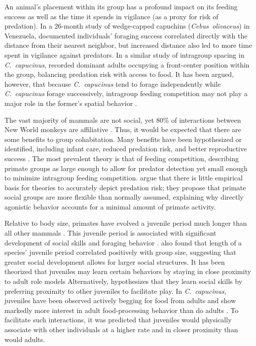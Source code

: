 \documentclass{../../../coursework}
\begin{document}
An animal's placement within its group has a profound impact on its feeding
success as well as the time it spends in vigilance (as a proxy for risk of
predation). In a 26-month study of wedge-capped capuchins
(\emph{Cebus~olivaceus}) in Venezuela, \textcite{Robinson1981} documented
individuals' foraging success correlated directly with the distance from their
nearest neighbor, but increased distance also led to more time spent in
vigilance against predators. In a similar study of intragroup spacing in
\emph{C.~capucinus}, \textcite{Hall1997} recorded dominant adults occupying a
front-center position within the group, balancing predation risk with access
to food. It has been argued, however, that because \emph{C.~capucinus} tend to
forage independently while \emph{C.~capucinus} forage successively, intragroup
feeding competition may not play a major role in the former's spatial behavior
\parencite{Fragaszy2004}.

The vast majority of mammals are not social, yet 80\% of interactions between
New World monkeys are affiliative \parencite{Sussman2005}. Thus, it would be
expected that there are some benefits to group cohabitation. Many benefits
have been hypothesized or identified, including infant care, reduced predation
risk, and better reproductive success \parencite{Fragaszy2004}. The most
prevalent theory is that of feeding competition, describing primate groups as
large enough to allow for predator detection yet small enough to minimize
intragroup feeding competition. \textcite{Sussman2011} argue that there is
little empirical basis for theories to accurately depict predation risk; they
propose that primate social groups are more flexible than normally assumed,
explaining why directly agonistic behavior accounts for a minimal amount of
primate activity.

Relative to body size, primates have evolved a juvenile period much longer
than all other mammals \parencite{Harvey1985}. This juvenile period is
associated with significant development of social skills \parencite{Joffe1997}
and foraging behavior \parencite{Rapaport2008}. \textcite{Joffe1997} also
found that length of a species' juvenile period correlated positively with
group size, suggesting that greater social development allows for larger
social structures. It has been theorized that juveniles may learn certain
behaviors by staying in close proximity to adult role models
\parencite{Sherrow2011} Alternatively, \textcite{Strier2007} hypothesizes that
they learn social skills by preferring proximity to other juveniles to
facilitate play. In \emph{C.~capucinus}, juveniles have been observed actively
begging for food from adults \parencite{Perry1994} and show markedly more
interest in adult food-processing behavior than do adults
\parencite{OMalley2005}. To facilitate such interactions, it was predicted
that juveniles would physically associate with other individuals at a higher
rate and in closer proximity than would adults.
\end{document}
